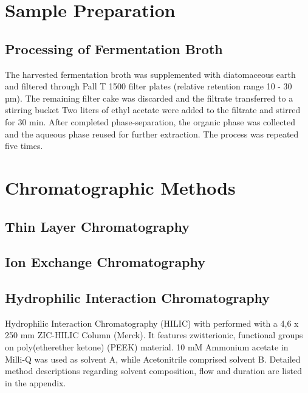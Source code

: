 
\section{Sample Preparation} %
\label{sec:sample_preparation}

	\subsection{Processing of Fermentation Broth} %
	\label{sub:processing_of_fermentation_broth}
	The harvested fermentation broth was supplemented with diatomaceous earth and filtered through Pall T 1500 filter plates (relative retention range 10 - 30 µm). The remaining filter cake was discarded and the filtrate transferred to a stirring bucket %
	Two liters of ethyl acetate were added to the filtrate and stirred for 30 min. After completed phase-separation, the organic phase was collected and the aqueous phase reused for further extraction. The process was repeated five times.

\section{Chromatographic Methods} %
\label{sec:chromatographic_methods}

	\subsection{Thin Layer Chromatography} %
	\label{sub:thin_layer_chromatography}

	\subsection{Ion Exchange Chromatography} %
	\label{sub:ion_exchange_chromatography}

	\subsection{Hydrophilic Interaction Chromatography} %
	\label{sub:hilic}

	Hydrophilic Interaction Chromatography (HILIC) with performed with a 4,6 x 250 mm ZIC-HILIC Column (Merck). It features zwitterionic, functional groups on poly(etherether ketone) (PEEK) material.
	10 mM Ammonium acetate in Milli-Q  was used as solvent A, while Acetonitrile comprised solvent B. Detailed method descriptions regarding solvent composition, flow and duration are listed in the appendix.

